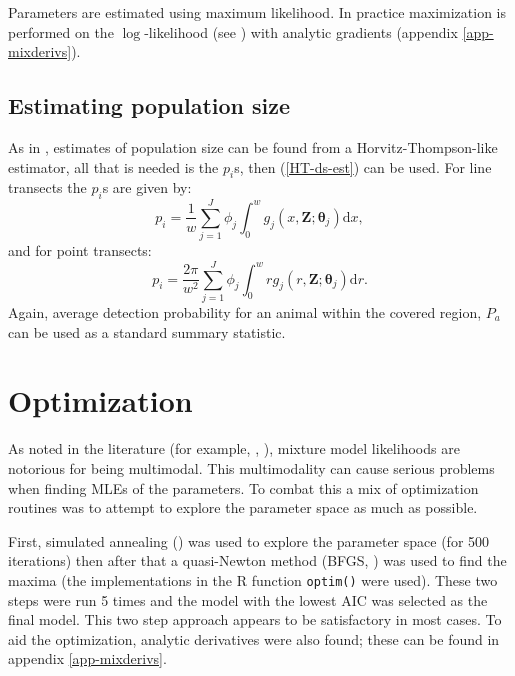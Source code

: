 Parameters are estimated using maximum likelihood. In practice maximization is performed on the $\log$-likelihood (see ) with analytic gradients (appendix \ref{app-mixderivs}).



\subsection{Estimating population size}

As in , estimates of population size can be found from a Horvitz-Thompson-like estimator, all that is needed is the $p_i$s, then (\ref{HT-ds-est}) can be used. For line transects the $p_i$s are given by:
\begin{equation*}
p_i = \frac{1}{w} \sum_{j=1}^J \phi_j \int_0^w  g_j(x,\mathbf{Z}; \bm{\theta}_j) \text{d}x,
\end{equation*}
and for point transects:
\begin{equation*}
p_i = \frac{2\pi}{w^2} \sum_{j=1}^J \phi_j \int_0^w  r g_j(r,\mathbf{Z}; \bm{\theta}_j) \text{d}r.
\end{equation*}
Again, average detection probability for an animal within the covered region, $P_a$ can be used as a standard summary statistic.


\section{Optimization}
\label{s:optimization}

As noted in the literature (for example, \cite[463-480]{BDA}, \cite{robert}), mixture model likelihoods are notorious for being multimodal. This multimodality can cause serious problems when finding MLEs of the parameters. To combat this a mix of optimization routines was to attempt to explore the parameter space as  much as possible.

First, simulated annealing (\cite[pp. 549-554]{numrec}) was used to explore the parameter space (for 500 iterations) then after that a quasi-Newton method (BFGS, \cite{bfgs}) was used to find the maxima (the implementations in the \textsf{R} function \texttt{optim()} were used). These two steps were run 5 times and the model with the lowest AIC was selected as the final model. This two step approach appears to be satisfactory in most cases. To aid the optimization, analytic derivatives were also found; these can be found in appendix \ref{app-mixderivs}.

